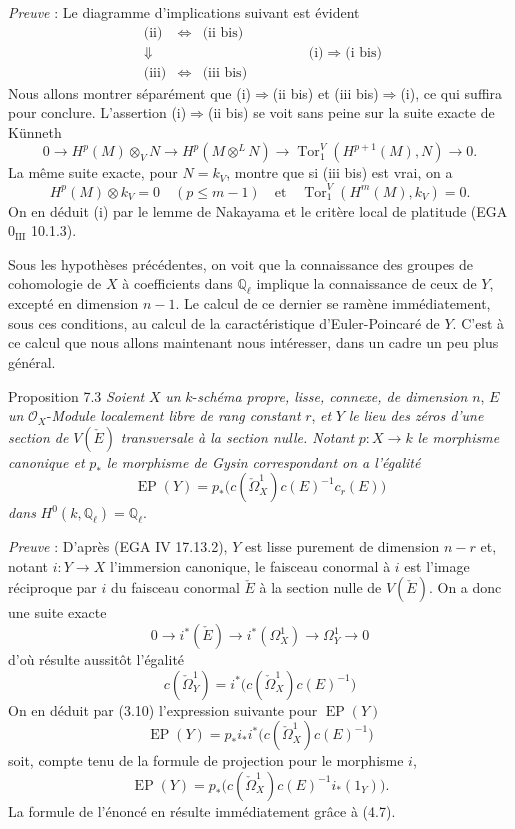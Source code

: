 \emph{Preuve} : Le diagramme d'implications suivant est évident
\[
\begin{array}{ccc}
\text{(ii)}&\Leftrightarrow&\text{(ii bis)}\\
\Downarrow&&\\
\text{(iii)}&\Leftrightarrow&\text{(iii bis)}
\end{array}
\qquad\qquad
\text{(i)}\Rightarrow\text{(i bis)}
\]
Nous allons montrer séparément que (i)$\Rightarrow$(ii bis) et (iii bis)$\Rightarrow$(i), ce qui suffira pour conclure. L'assertion (i)$\Rightarrow$(ii bis) se voit sans peine sur la suite exacte de Künneth
\[
0\to H^p(M)\otimes_V N\to H^p(M\otimes^L N)\to \operatorname{Tor}_1^V(H^{p+1}(M),N)\to0.
\]
La même suite exacte, pour $N=k_V$, montre que si (iii bis) est vrai, on a
\[
H^p(M)\otimes k_V=0\quad(p\le m-1)\quad\text{et}\quad
\operatorname{Tor}_1^V(H^m(M),k_V)=0.
\]
On en
déduit (i) par le lemme de Nakayama et le critère local de platitude (EGA $0_{\mathrm{III}}$ 10.1.3).

Sous les hypothèses précédentes, on voit que la connaissance des groupes de cohomologie de $X$ à coefficients dans $\mathbb{Q}_\ell$ implique la connaissance de ceux de $Y$, excepté en dimension $n-1$. Le calcul de ce dernier se ramène immédiatement, sous ces conditions, au calcul de la caractéristique d'Euler-Poincaré de $Y$. C'est à ce calcul que nous allons maintenant nous intéresser, dans un cadre un peu plus général.

\begin{statement}{Proposition 7.3}
\emph{Soient} $X$ \emph{un} $k$-\emph{schéma propre, lisse, connexe, de dimension} $n$, $E$ \emph{un} $\mathcal{O}_X$-\emph{Module localement libre de rang constant} $r$, \emph{et} $Y$ \emph{le lieu des zéros d'une section de} $V(\check E)$ \emph{transversale à la section nulle. Notant} $p:X\to k$ \emph{le morphisme canonique et} $p_*$ \emph{le morphisme de Gysin correspondant on a l'égalité}
\[
\operatorname{EP}(Y)=p_*\bigl(c(\check\Omega_X^1)c(E)^{-1}c_r(E)\bigr)
\]
\emph{dans} $H^0(k,\mathbb{Q}_\ell)=\mathbb{Q}_\ell$.
\end{statement}

\emph{Preuve} : D'après (EGA IV 17.13.2), $Y$ est lisse purement de dimension $n-r$ et, notant $i:Y\to X$ l'immersion canonique, le faisceau conormal à $i$ est l'image réciproque par $i$ du faisceau conormal $\check E$ à la section nulle de $V(\check E)$. On a donc une suite exacte
\[
0\to i^*(\check E)\to i^*(\Omega_X^1)\to\Omega_Y^1\to0
\tag{7.3.1}
\]
d'où résulte aussitôt l'égalité
\[
c(\check\Omega_Y^1)=i^*\bigl(c(\check\Omega_X^1)c(E)^{-1}\bigr)
\tag{7.3.2}
\]
On en déduit par (3.10) l'expression suivante pour $\operatorname{EP}(Y)$
\[
\operatorname{EP}(Y)=p_*i_*i^*\bigl(c(\check\Omega_X^1)c(E)^{-1}\bigr)
\]
soit, compte tenu de la formule de projection pour le morphisme $i$,
\[
\operatorname{EP}(Y)=p_*\bigl(c(\check\Omega_X^1)c(E)^{-1}i_*(1_Y)\bigr).
\]
La formule de l'énoncé en résulte immédiatement grâce à (4.7).

